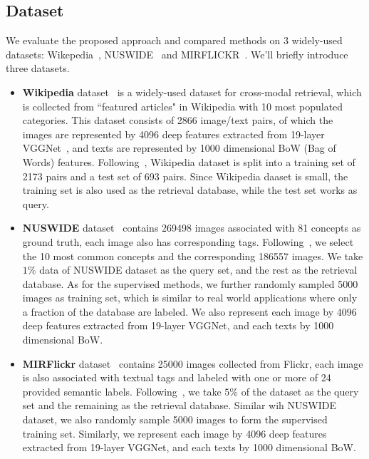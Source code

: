\documentclass[journal]{IEEEtran}
\begin{document}
\subsection{Dataset}
We evaluate the proposed approach and compared methods on 3 widely-used datasets: Wikepedia~\cite{wikipedia}, NUSWIDE~\cite{nuswide} and MIRFLICKR~\cite{mirflickr}. We'll briefly introduce three datasets.
\begin{itemize}
	\item \textbf{Wikipedia} dataset~\cite{wikipedia} is a widely-used dataset for cross-modal retrieval, which is collected from ``featured articles" in Wikipedia with 10 most populated categories. This dataset consists of 2866 image/text pairs, of which the images are represented by 4096 deep features extracted from 19-layer VGGNet~\cite{vgg19}, and texts are represented by 1000 dimensional BoW (Bag of Words) features. Following~\cite{SePH}, Wikipedia dataset is split into a training set of 2173 pairs and a test set of 693 pairs. Since Wikipedia daaset is small, the training set is also used as the retrieval database, while the test set works as query.
	\item \textbf{NUSWIDE} dataset~\cite{nuswide} contains 269498 images associated with 81 concepts as ground truth, each image also has corresponding tags. Following~\cite{SePH}, we select the 10 most common concepts and the corresponding 186557 images. We take $1\%$ data of NUSWIDE dataset as the query set, and the rest as the retrieval database. As for the supervised methods, we further randomly sampled 5000 images as training set, which is similar to real world applications where only a fraction of the database are labeled. We also represent each image by 4096 deep features extracted from 19-layer VGGNet, and each texts by 1000 dimensional BoW.
	\item \textbf{MIRFlickr} dataset~\cite{mirflickr} contains 25000 images collected from Flickr, each image is also associated with textual tags and labeled with one or more of 24  provided semantic labels. Following~\cite{SePH}, we take $5\%$ of the dataset as the query set and the remaining as the retrieval database. Similar wih NUSWIDE dataset, we also randomly sample 5000 images to form the supervised training set. Similarly, we represent each image by 4096 deep features extracted from 19-layer VGGNet, and each texts by 1000 dimensional BoW.
\end{itemize}
\end{document}
